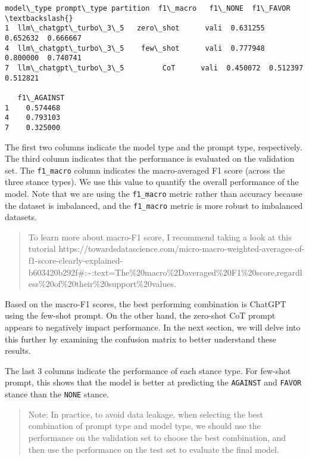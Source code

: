 \documentclass[11pt]{article}
\makeatletter
\newcommand{\boxspacing}{\kern\kvtcb@left@rule\kern\kvtcb@boxsep}
\newcommand{\prompt}[4]{
        {\ttfamily\llap{{\color{#2}[#3]:\hspace{3pt}#4}}\vspace{-\baselineskip}}
    }
\makeatother
\begin{document}
            \begin{tcolorbox}[breakable, size=fbox, boxrule=.5pt, pad at break*=1mm, opacityfill=0]
\prompt{Out}{outcolor}{47}{\boxspacing}
\begin{Verbatim}[commandchars=\\\{\}]
              model\_type prompt\_type partition  f1\_macro   f1\_NONE  f1\_FAVOR  \textbackslash{}
1  llm\_chatgpt\_turbo\_3\_5   zero\_shot      vali  0.631255  0.652632  0.666667
4  llm\_chatgpt\_turbo\_3\_5    few\_shot      vali  0.777948  0.800000  0.740741
7  llm\_chatgpt\_turbo\_3\_5         CoT      vali  0.450072  0.512397  0.512821

   f1\_AGAINST
1    0.574468
4    0.793103
7    0.325000
\end{Verbatim}
\end{tcolorbox}
        
    The first two columns indicate the model type and the prompt type,
respectively. The third column indicates that the performance is
evaluated on the validation set. The \texttt{f1\_macro} column indicates
the macro-averaged F1 score (across the three stance types). We use this
value to quantify the overall performance of the model. Note that we are
using the \texttt{f1\_macro} metric rather than accuracy because the
dataset is imbalanced, and the \texttt{f1\_macro} metric is more robust
to imbalanced datasets.

    \begin{quote}
To learn more about macro-F1 score, I recommend taking a look at this
tutorial
https://towardsdatascience.com/micro-macro-weighted-averages-of-f1-score-clearly-explained-b603420b292f\#:\textasciitilde:text=The\%20macro\%2Daveraged\%20F1\%20score,regardless\%20of\%20their\%20support\%20values.
\end{quote}

    Based on the macro-F1 scores, the best performing combination is ChatGPT
using the few-shot prompt. On the other hand, the zero-shot CoT prompt
appears to negatively impact performance. In the next section, we will
delve into this further by examining the confusion matrix to better
understand these results.

The last 3 columns indicate the performance of each stance type. For
few-shot prompt, this shows that the model is better at predicting the
\texttt{AGAINST} and \texttt{FAVOR} stance than the \texttt{NONE}
stance.

\begin{quote}
Note: In practice, to avoid data leakage, when selecting the best
combination of prompt type and model type, we should use the performance
on the validation set to choose the best combination, and then use the
performance on the test set to evaluate the final model.
\end{quote}
\end{document}
